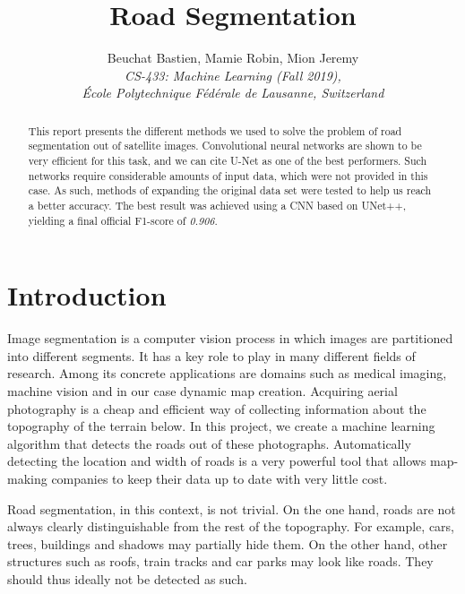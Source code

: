 \documentclass[10pt,conference,a4paper]{IEEEtran}
\begin{document}
\title{Road Segmentation}
\author{
  Beuchat Bastien, Mamie Robin, Mion Jeremy\\
  \textit{CS-433: Machine Learning (Fall 2019),}\\
   \textit{École Polytechnique Fédérale de Lausanne, Switzerland}
}

\maketitle

\begin{abstract}
This report presents the different methods we used to solve the problem of road segmentation out of satellite images.
Convolutional neural networks are shown to be very efficient for this task, and we can cite U-Net \cite{unet} as one of the best performers.
Such networks require considerable amounts of input data, which were not provided in this case.
As such, methods of expanding the original data set were tested to help us reach a better accuracy.
The best result was achieved using a CNN based on UNet++, yielding a final official F1-score of \textit{0.906}.
\end{abstract}

\section{Introduction}

Image segmentation is a computer vision process in which images are partitioned into different segments.
It has a key role to play in many different fields of research.
Among its concrete applications are domains such as medical imaging, machine vision and in our case dynamic map creation.
Acquiring aerial photography is a cheap and efficient way of collecting information about the topography of the terrain below.
In this project, we create a machine learning algorithm that detects the roads out of these photographs.
Automatically detecting the location and width of roads is a very powerful tool that allows map-making companies to keep their data up to date with very little cost.

Road segmentation, in this context, is not trivial.
On the one hand, roads are not always clearly distinguishable from the rest of the topography.
For example, cars, trees, buildings and shadows may partially hide them.
On the other hand, other structures such as roofs, train tracks and car parks may look like roads.
They should thus ideally not be detected as such.
\end{document}

